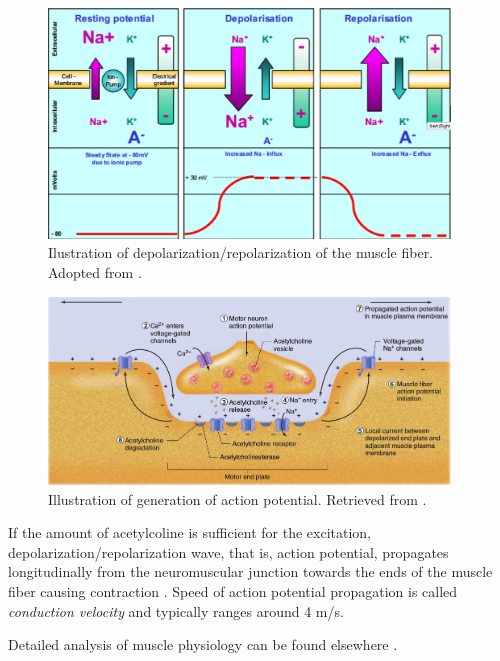 \begin{figure}[ht]
\centering
\includegraphics[width=0.95\textwidth]{Images/introduction/Depolarization.png}
\caption{Ilustration of depolarization/repolarization of the muscle fiber. Adopted from \citep{Nazmi2016}.}
\label{fig:depolarization}
\end{figure}

\begin{figure}[ht]
\centering
\includegraphics[width=0.95\textwidth]{Images/introduction/action_potential_generation.png}
\caption{Illustration of generation of action potential. Retrieved from \citep{Widmaier2014}.}
\label{fig:action_potential_generation}
\end{figure}
  
If the amount of acetylcoline is sufficient for the excitation, depolarization/repolarization wave, that is, action potential, propagates longitudinally from the neuromuscular junction towards the ends of the muscle fiber causing contraction \citep{Henneberg1999}. Speed of action potential propagation is called \emph{conduction velocity} and typically ranges around 4 m/s.

Detailed analysis of muscle physiology can be found elsewhere \citep{Squire1986, Widmaier2014}.




